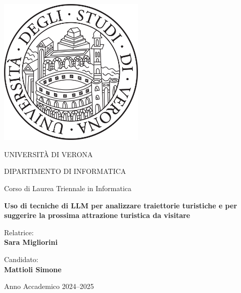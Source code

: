 \begin{titlepage}
    \centering
    
    \includegraphics[width=7cm]{images/univr.png}\par\vspace{1cm}
    
    {\LARGE UNIVERSITÀ DI VERONA \par}
    \vspace{2mm}
    {\large DIPARTIMENTO DI INFORMATICA \par}
    \vspace{5mm}
    {\LARGE Corso di Laurea Triennale in Informatica \par}
    
    \vspace{15mm}
    
    {\Huge \textbf{Uso di tecniche di LLM per analizzare traiettorie turistiche e per suggerire la prossima attrazione turistica da visitare}\par}
    
    \vfill
    
    \begin{minipage}[t]{0.47\textwidth}
        \raggedright
        {\large Relatrice:}\\[3mm]
        {\Large \textbf{Sara Migliorini}}
    \end{minipage}
    \hfill
    \begin{minipage}[t]{0.47\textwidth}
        \raggedleft
        {\large Candidato:}\\[3mm]
        {\Large \textbf{Mattioli Simone}}
    \end{minipage}
    
    \vspace{20mm}
    
    {\large Anno Accademico 2024--2025}
\end{titlepage}